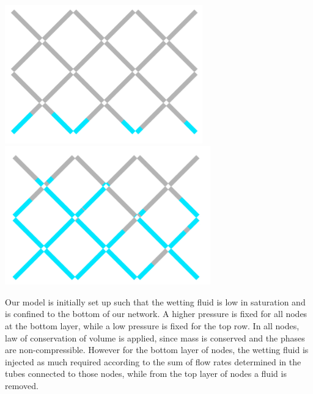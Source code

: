 \includegraphics[height=6cm]{diagram/fig_initial-fill-distribution}
\includegraphics[height=6cm]{diagram/fig_final-fill-distribution}

Our model is initially set up such that the wetting fluid is low in saturation and is confined to the bottom of our network. A higher pressure is fixed for all nodes at the bottom layer, while a  low pressure is fixed for the top row. In all nodes, law of conservation of volume is applied, since mass is conserved and the phases are non-compressible. However for the bottom layer of nodes, the wetting fluid is injected as much required according to the sum of flow rates determined in the tubes connected to those nodes, while from the top layer of nodes a fluid is removed.

